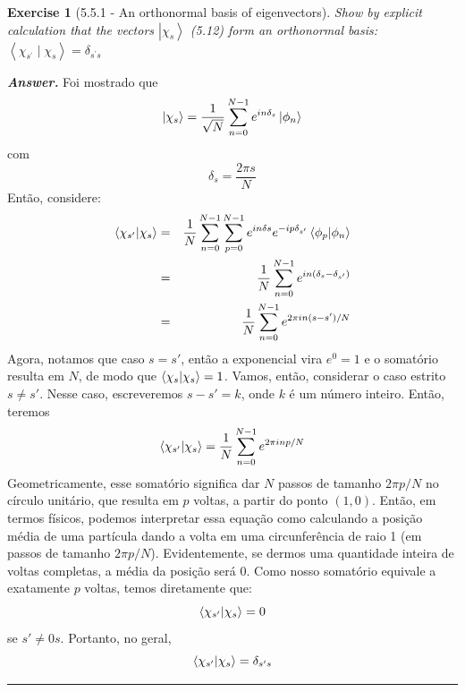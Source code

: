 \documentclass[12pt]{article}
\def\be{\begin{equation}}
\def\ee{\end{equation}}
\def\bea{\begin{eqnarray*}}
\def\eea{\end{eqnarray*}}
\def\f{\frac}
\newtheorem{exercise}{Exercise}
\newenvironment{answer}{\noindent\textbf{\textit{Answer.}} \normalfont }{\par\noindent\rule{\textwidth}{0.4pt}}
\begin{document}
	\begin{exercise}[5.5.1 - An orthonormal basis of eigenvectors]
		Show by explicit calculation that the vectors $\left|\chi_{s}\right\rangle$ (5.12) form an orthonormal basis: $\left\langle\chi_{s^{\prime}} \mid \chi_{s}\right\rangle=\delta_{s^{\prime} s}$
	\end{exercise}
	\begin{answer}
		Foi mostrado que
		\be
			\ket{\chi_s} = \f{1}{\sqrt{N}}\sum_{n=0}^{N-1} e^{in\delta_s}\ket{\phi_n}
		\ee
		com
		\be
			\delta_s = \f{2\pi s}{N}
		\ee
		Então, considere:
		\bea
			\braket{ \chi_{s'} | \chi_s} &=& \f{1}{N} \sum_{n=0}^{N-1} \sum_{p=0}^{N-1} e^{in\delta s}e^{-ip\delta_{s'}} \braket{\phi_p | \phi_n} \\
				&=& \f{1}{N} \sum_{n=0}^{N-1} e^{in(\delta_s - \delta_{s'})} \\
				&=& \f{1}{N} \sum_{n=0}^{N-1} e^{2\pi in (s-s') / N}
		\eea
		Agora, notamos que caso $s=s'$, então a exponencial vira $e^0=1$ e o somatório resulta em $N$, de modo que $\braket{\chi_s | \chi_s} = 1$. Vamos, então, considerar o caso estrito $s\not=s'$. Nesse caso, escreveremos $s-s' = k$, onde $k$ é um número inteiro. Então, teremos
		\be
			\braket{ \chi_{s'} | \chi_s} = \f{1}{N} \sum_{n=0}^{N-1} e^{2\pi i np/N}
		\ee
		Geometricamente, esse somatório significa dar $N$ passos de tamanho $2\pi p/N$ no círculo unitário, que resulta em $p$ voltas, a partir do ponto $(1, 0)$. Então, em termos físicos, podemos interpretar essa equação como calculando a posição média de uma partícula dando a volta em uma circunferência de raio 1 (em passos de tamanho $2\pi p/N$). Evidentemente, se dermos uma quantidade inteira de voltas completas, a média da posição será 0. Como nosso somatório equivale a exatamente $p$ voltas, temos diretamente que:
		\be
			\braket{\chi_{s'} | \chi_s} = 0
		\ee
		se $s'\not=0s$. Portanto, no geral,
		\be
			\braket{\chi_{s'} | \chi_s} = \delta_{s's}
		\ee
	\end{answer}
	
\end{document}
